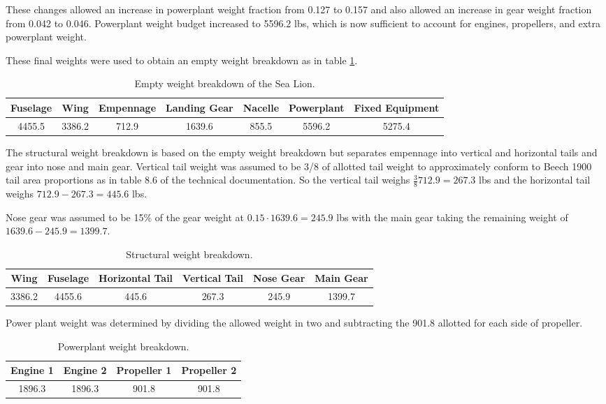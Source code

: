 \documentclass[conf]{new-aiaa}
\begin{document}
These changes allowed an increase in powerplant weight fraction from 0.127 to 0.157 and also allowed an increase in gear weight fraction from 0.042 to 0.046. Powerplant weight budget increased to 5596.2 lbs, which is now sufficient to account for engines, propellers, and extra powerplant weight.

These final weights were used to obtain an empty weight breakdown as in table \ref{tab:Empty Weight}.

\begin{table}[H]
\centering
\label{tab:Empty Weight}
\caption{Empty weight breakdown of the Sea Lion.}
\begin{tabular}{|c|c|c|c|c|c|c|}\hline
Fuselage & Wing & Empennage & Landing Gear & Nacelle & Powerplant & Fixed Equipment \\ \hline
4455.5 & 3386.2 & 712.9 & 1639.6 & 855.5 & 5596.2 & 5275.4 \\ \hline
\end{tabular}
\end{table}
The structural weight breakdown is based on the empty weight breakdown but separates empennage into vertical and horizontal tails and gear into nose and main gear. Vertical tail weight was assumed to be 3/8 of allotted tail weight to approximately conform to Beech 1900 tail area proportions as in table 8.6 of the technical documentation\cite{orange_book}. So the vertical tail weighs $\frac{3}{8}712.9=267.3$ lbs and the horizontal tail weighs $712.9-267.3=445.6$ lbs. 

Nose gear was assumed to be 15\%\cite{pres19} of the gear weight at $0.15\cdot1639.6=245.9$ lbs with the main gear taking the remaining weight of $1639.6-245.9=1399.7$. 
\begin{table}[H]
\centering
\label{tab:Structural Weight}
\caption{Structural weight breakdown.}
\begin{tabular}{|c|c|c|c|c|c|}\hline
Wing & Fuselage & Horizontal Tail & Vertical Tail & Nose Gear & Main Gear \\ \hline
3386.2 & 4455.6 & 445.6 & 267.3 & 245.9 & 1399.7 \\ \hline
\end{tabular}
\end{table}

Power plant weight was determined by dividing the allowed weight in two and subtracting the 901.8 allotted for each side of propeller.

\begin{table}[H]
\centering
\label{tab:Powerplant Weight}
\caption{Powerplant weight breakdown.}
\begin{tabular}{|c|c|c|c|}\hline
Engine 1 & Engine 2 & Propeller 1 & Propeller 2 \\ \hline
1896.3 & 1896.3 & 901.8 & 901.8 \\ \hline
\end{tabular}
\end{table}
\end{document}
